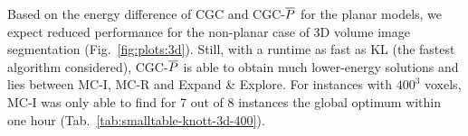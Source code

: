 Based on the energy difference of CGC and CGC-$\overline{P}$ for the planar models,
we expect reduced performance for the non-planar case of 3D volume image
segmentation (Fig.~\ref{fig:plots:3d}). Still, with a runtime
as fast as KL (the fastest algorithm considered),
CGC-$\overline{P}$ is able to obtain much lower-energy solutions and
lies between MC-I, MC-R and Expand \& Explore.
%
For instances with $400^3$ voxels, MC-I was only able to find for 7 out of 
8 instances the global optimum within one hour
(Tab.~\ref{tab:smalltable-knott-3d-400}).


